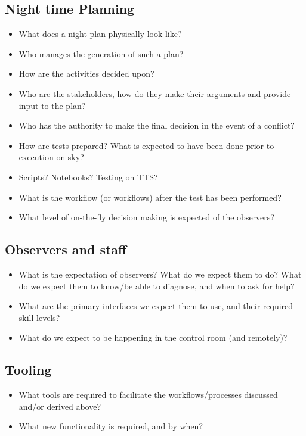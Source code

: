 \documentclass[SE,authoryear,toc]{lsstdoc}
\begin{document}
\subsection{Night time Planning}
\begin{itemize}
\item What does a night plan physically look like?
\item Who manages the generation of such a plan?
\item How are the activities decided upon?
\item Who are the stakeholders, how do they make their arguments and provide input to the plan?
\item Who has the authority to make the final decision in the event of a conflict?
\item How are tests prepared? What is expected to have been done prior to execution on-sky?
\item Scripts? Notebooks? Testing on TTS?
\item What is the workflow (or workflows) after the test has been performed?
\item What level of on-the-fly decision making is expected of the observers?
\end{itemize}


\subsection{Observers and staff}
\begin{itemize}
\item What is the expectation of observers? What do we expect them to do? What do we expect them to know/be able to diagnose, and when to ask for help?
\item What are the primary interfaces we expect them to use, and their required skill levels?
\item What do we expect to be happening in the control room (and remotely)?
\end{itemize}

\subsection{Tooling}
\begin{itemize}
\item What tools are required to facilitate the workflows/processes discussed and/or derived above?
\item What new functionality is required, and by when?
\end{itemize}
\end{document}

